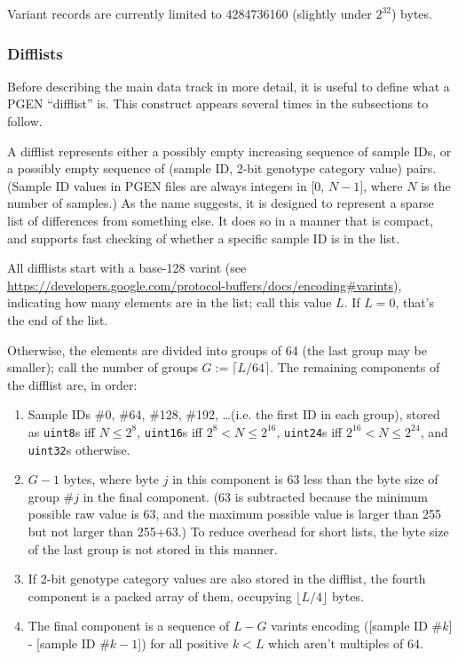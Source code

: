 \documentclass[8pt]{article}
\begin{document}
Variant records are currently limited to 4284736160 (slightly under $2^{32}$)
bytes.

\subsubsection{Difflists}

Before describing the main data track in more detail, it is useful to define
what a PGEN ``difflist'' is.  This construct appears several times in the
subsections to follow.

A difflist represents either a possibly empty increasing sequence of sample
IDs, or a possibly empty sequence of (sample ID, 2-bit genotype category value)
pairs.  (Sample ID values in PGEN files are always integers in [0, $N-1$],
where $N$ is the number of samples.)  As the name suggests, it is designed to
represent a sparse list of differences from something else.  It does so in a
manner that is compact, and supports fast checking of whether a specific sample
ID is in the list.

All difflists start with a base-128 varint (see
\url{https://developers.google.com/protocol-buffers/docs/encoding#varints}),
indicating how many elements are in the list; call this value $L$.  If $L=0$,
that's the end of the list.

Otherwise, the elements are divided into groups of 64 (the last group may be
smaller); call the number of groups $G:=\lceil L/64\rceil $.  The remaining
components of the difflist are, in order:

\begin{enumerate}
\item Sample IDs \#0, \#64, \#128, \#192, \ldots (i.e. the first ID in each
  group), stored as \texttt{uint8}s iff $N\leq 2^8$, \texttt{uint16}s iff
  $2^8<N\leq 2^{16}$, \texttt{uint24}s iff $2^{16}<N\leq 2^{24}$, and
  \texttt{uint32}s otherwise.
\item $G-1$ bytes, where byte $j$ in this component is 63 less than the byte
  size of group \#$j$ in the final component.  (63 is subtracted because the
  minimum possible raw value is 63, and the maximum possible value is larger
  than 255 but not larger than 255+63.)  To reduce overhead for short lists,
  the byte size of the last group is not stored in this manner.
\item If 2-bit genotype category values are also stored in the difflist, the
  fourth component is a packed array of them, occupying $\lfloor L/4\rfloor $
  bytes.
\item The final component is a sequence of $L-G$ varints encoding ([sample ID
  \#$k$] - [sample ID \#$k-1$]) for all positive $k<L$ which aren't multiples
  of 64.
\end{enumerate}
\end{document}
